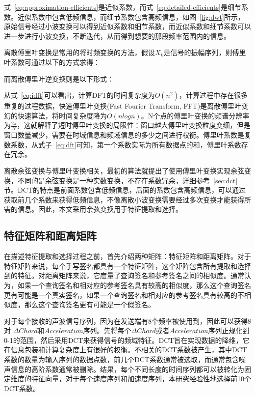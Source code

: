 式~\ref{eq:approximation-efficients}是近似系数，而式~\ref{eq:detailed-efficients}是细节系数。近似系数中包含低频信息，而细节系数包含高频信息，如图~\ref{fig:dwt}所示，原始信号经过小波变换可以得到近似系数和细节系数，而近似系数和细节系数可以进一步进行小波变换，不断迭代，从而得到想要的那段频率范围内的信息。


离散傅里叶变换是常用的将时频变换的方法，假设$X_{k}$是信号的振幅序列，则傅里叶系数可通过以下的方式求得：

而离散傅里叶逆变换则是以下形式：

从式~\ref{eq:idft}可以看出，计算DFT的时间复杂度为$O(n^{2})$，计算过程中存在很多重复的过程数据，快速傅里叶变换(Fast Fourier Transform, FFT)是离散傅里叶变幻的快速算法，将时间复杂度降为$O(nlog n)$。N个点的傅里叶变换的频谱分辨率为$\frac{2\pi}{N}$，这就解释了短时傅里叶变换的局限性：窗口越大傅里叶变换粒度变细，但是窗口数量减少，需要在时域信息和频域信息的多少之间进行权衡。傅里叶系数是复数系数，从式子~\ref{eq:dft}可知，第一个系数实际为所有数据点的和，傅里叶系数存在冗余。

离散余弦变换与傅里叶变换相关，最初的算法就提出了使用傅里叶变换实现余弦变换，不同的是余弦变换是一种实数变换，不存在系数冗余，详细参考~\ref{sec:dct}节。DCT的特点是前面系数包含低频信息，后面的系数包含高频信息，可以通过获取前几个系数来获得低频信息，不像离散小波变换需要经过多次变换才能获得所需的信息。因此，本文采用余弦变换用于特征提取和选择。

\subsection{特征矩阵和距离矩阵}  \label{sec:feature-distance-matrix}
在描述特征提取和选择过程之前，首先介绍两种矩阵：特征矩阵和距离矩阵。对于特征矩阵来说，每个手写签名都具有一个特征矩阵，这个矩阵包含所有提取和选择到的特征。对距离矩阵来说，它度量了查询签名和参考签名之间的相似度。通常认为，如果一个查询签名和相对应的参考签名具有较高的相似度，那么这个查询签名更有可能是一个真实签名，如果一个查询签名和相对应的参考签名具有较高的不相似度，那么这个查询签名更有可能是一个假签名。

对于每个接收的声波信号序列，因为在发送端有8个频率被使用到，因此可以获得8对 $\Delta Chord$和$Acceleration$序列。先将每个$\Delta Chord$或者$Acceleration$序列正规化到0-1的范围，然后采用DCT来获得信号的频域特征。DCT旨在实现数据的降维，它在信息包装和计算复杂度上有很好的权衡。不相关的DCT系数被产生，其中DCT系数的数量为输入序列的数据点数，前几个DCT系数通常被选取，而通常包含噪声信息的高阶系数通常被删除。结果，每个不同长度的时间序列都可以被转化为固定维度的特征向量，对于每个速度序列和加速度序列，本研究经验性地选择前10个DCT系数。

